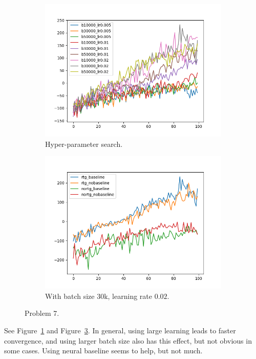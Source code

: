 \begin{figure}[htbp]
    \begin{subfigure}[b]{0.5\linewidth}
        \centering
        \includegraphics[width=1.0\linewidth]{figures/p7-hyper.png}
        \caption{Hyper-parameter search. }
        \label{fig:p7-hyper}
    \end{subfigure}
    \begin{subfigure}[b]{0.5\linewidth}
        \centering
        \includegraphics[width=1.0\linewidth]{figures/p7-final.png}
        \caption{With batch size 30k, learning rate $0.02$.}
        \label{fig:p7-final}
    \end{subfigure}
    \caption{Problem 7.}
\end{figure}

See Figure~\ref{fig:p7-hyper} and Figure~\ref{fig:p7-final}. In general, using large learning leads to faster convergence, and using larger batch size also has this effect, but not obvious in some cases. Using neural baseline seems to help, but not much.
